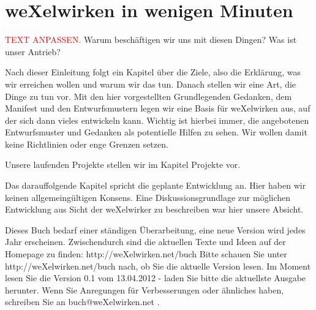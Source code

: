   \section{weXelwirken in wenigen Minuten}
\textcolor{red}{TEXT ANPASSEN.}
Warum beschäftigen wir uns mit diesen Dingen? Was ist unser Antrieb?


Nach dieser Einleitung folgt ein Kapitel über die Ziele, also die Erklärung, was wir erreichen wollen und warum wir das tun.
%
Danach stellen wir eine Art, die Dinge zu tun vor.
%
Mit den hier vorgestellten Grundlegenden Gedanken, dem Manifest und den Entwurfsmustern legen wir eine Basis für weXelwirken aus, auf der sich dann vieles entwickeln kann.
%
Wichtig ist hierbei immer, die angebotenen Entwurfsmuster und Gedanken als potentielle Hilfen zu sehen. 
%
Wir wollen damit keine Richtlinien oder enge Grenzen setzen.



Unsere laufenden Projekte stellen wir im Kapitel Projekte vor.



Das darauffolgende Kapitel spricht die geplante Entwicklung an.
%
Hier haben wir keinen allgemeingültigen Konsens.
%
Eine Diskussionsgrundlage zur möglichen Entwicklung aus Sicht der weXelwirker zu beschreiben war hier unsere Absicht.




Dieses Buch bedarf einer ständigen Überarbeitung, eine neue Version wird jedes Jahr erscheinen.
%
Zwischendurch sind die aktuellen Texte und Ideen auf der Homepage zu finden: http://weXelwirken.net/buch
%
Bitte schauen Sie unter\\ http://weXelwirken.net/buch nach, ob Sie die aktuelle Version lesen.
%
Im Moment lesen Sie die Version 0.1 vom 13.04.2012 - laden Sie bitte die aktuellste Ausgabe herunter.
%
Wenn Sie Anregungen für Verbesserungen oder ähnliches haben, schreiben Sie an buch@weXelwirken.net .
